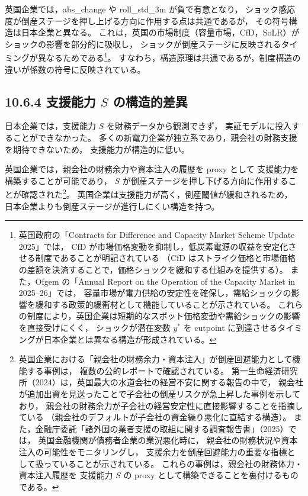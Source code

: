 英国企業では，abs\_change や roll\_std\_3m が負で有意となり，
ショック感応度が倒産ステージを押し上げる方向に作用する点は共通であるが，
その符号構造は日本企業と異なる。
これは，英国の市場制度（容量市場，CfD，SoLR）がショックの影響を部分的に吸収し，
ショックが倒産ステージに反映されるタイミングが異なるためである\footnote{
英国政府の「Contracts for Difference and Capacity Market Scheme Update 2025」では，
CfD が市場価格変動を抑制し，低炭素電源の収益を安定化させる制度であることが明記されている
（CfD はストライク価格と市場価格の差額を決済することで，価格ショックを緩和する仕組みを提供する）。
また，Ofgem の「Annual Report on the Operation of the Capacity Market in 2025–26」では，
容量市場が電力供給の安定性を確保し，需給ショックの影響を緩和する政策的緩衝材として機能していることが示されている。
これらの制度により，英国企業は短期的なスポット価格変動や需給ショックの影響を直接受けにくく，
ショックが潜在変数 $y^*$ を cutpoint に到達させるタイミングが日本企業とは異なる構造が形成されている。}。
すなわち，構造原理は共通であるが，制度構造の違いが係数の符号に反映されている。

\subsection*{10.6.4 支援能力 $S$ の構造的差異}

日本企業では，支援能力 $S$ を財務データから観測できず，
実証モデルに投入することができなかった。
多くの新電力企業が独立系であり，親会社の財務支援を期待できないため，
支援能力が構造的に低い。

英国企業では，親会社の財務余力や資本注入の履歴を proxy として
支援能力を構築することが可能であり，
$S$ が倒産ステージを押し下げる方向に作用することが確認された\footnote{
英国企業における「親会社の財務余力・資本注入」が倒産回避能力として機能する事例は，
複数の公的レポートで確認されている。
第一生命経済研究所（2024）は，英国最大の水道会社の経営不安に関する報告の中で，
親会社が追加出資を見送ったことで子会社の倒産リスクが急上昇した事例を示しており，
親会社の財務余力が子会社の経営安定性に直接影響することを指摘している
（親会社のデフォルトが子会社の資金繰り悪化に直結する構造）。
また，金融庁委託「諸外国の業者支援の取組に関する調査報告書」（2025）では，
英国金融機関が債務者企業の業況悪化時に，
親会社の財務状況や資本注入の可能性をモニタリングし，
支援余力を倒産回避能力の重要な指標として扱っていることが示されている。
これらの事例は，親会社の財務体力・資本注入履歴を
支援能力 $S$ の proxy として構築できることを裏付けるものである。}。
英国企業は支援能力が高く，倒産閾値が緩和されるため，
日本企業よりも倒産ステージが進行しにくい構造を持つ。

